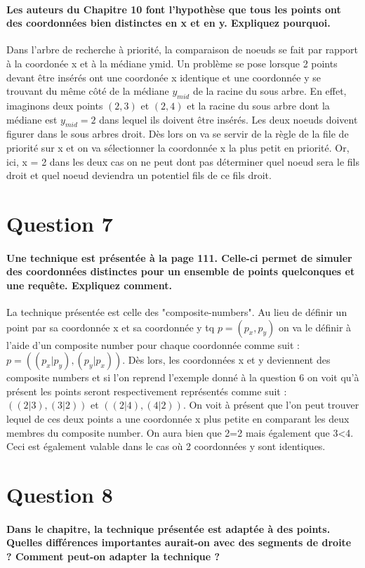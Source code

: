 \documentclass{article}
\begin{document}
    \paragraph{Les auteurs du Chapitre 10 font l’hypothèse que tous les points ont des coordonnées bien
distinctes en x et en y. Expliquez pourquoi.}
Dans l'arbre de recherche à priorité, la comparaison de noeuds se fait par rapport à la coordonée x et à la médiane ymid. Un problème se pose lorsque 2 points devant être insérés ont une coordonée x identique et une coordonnée y se trouvant du 
même côté de la médiane $y_{mid}$ de la racine du sous arbre. En effet, imaginons deux points $(2,3)$ et $(2,4)$ et la racine du sous arbre dont la médiane est $y_{mid} = 2$ dans lequel ils doivent être insérés. Les deux noeuds doivent figurer dans
le sous arbres droit. Dès lors on va se servir de la règle de la file de priorité sur x et on va sélectionner la coordonnée x la plus petit en priorité. Or, ici, x = 2 dans les deux cas on ne peut dont pas déterminer quel noeud sera le fils droit 
et quel noeud deviendra un potentiel fils de ce fils droit.

\section{Question 7}
    \paragraph{Une technique est présentée à la page 111. Celle-ci permet de simuler des coordonnées
distinctes pour un ensemble de points quelconques et une requête. Expliquez comment.}
La technique présentée est celle des "composite-numbers". Au lieu de définir un point par sa coordonnée x et sa coordonnée y tq $p = (p_x , p_y)$ on va le définir à l'aide
d'un composite number pour chaque coordonnée comme suit : $p = ((p_x|p_y),(p_y|p_x))$.
Dès lors, les coordonnées x et y deviennent des composite numbers et si l'on reprend l'exemple donné à la question 6 on voit qu'à présent les points seront respectivement
représentés comme suit : $((2|3), (3|2))$ et $((2|4),(4|2))$. On voit à présent que l'on peut trouver lequel de ces deux points a une coordonnée x plus petite en comparant
les deux membres du composite number. On aura bien que 2=2 mais également que 3<4. Ceci est également valable dans le cas où 2 coordonnées y sont identiques.

\section{Question 8}
    \paragraph{Dans le chapitre, la technique présentée est adaptée à des points. Quelles différences
    importantes aurait-on avec des segments de droite ? Comment peut-on adapter la technique ?}
\end{document}
